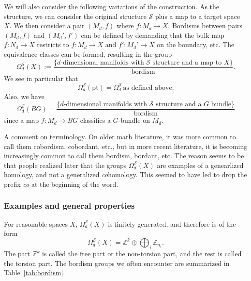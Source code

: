 \documentclass[12pt]{article}
\numberwithin{equation}{section}
\numberwithin{figure}{section}
\theoremstyle{remark}
\def\bZ{\mathbb{Z}}
\def\cS{\mathcal{S}}
\def\pt{\mathrm{pt}}
\begin{document}
We will also consider the following variations of the construction.
As the structure, we can consider the original structure $\cS$ plus a map to a target space $X$.
We then consider a pair $(M_d, f)$ where $f:M_d\to X$.
Bordisms between pairs $(M_d,f)$ and $(M_d',f')$ can be defined by demanding that 
the bulk map $f:N_d\to X$ restricts to $f:M_d\to X$ and $f':M_d'\to X$ on the boundary, etc.
The equivalence classes can be formed, resulting in the group \begin{equation}
\Omega^\cS_d(X) := \frac{
\{\text{$d$-dimensional manifolds with $\cS$ structure and a map to $X$} \} 
} { \text{bordism} }.
\end{equation}
We see in particular that \begin{equation}
\Omega^\cS_d(\pt) =\Omega^\cS_d\, \text{as defined above}.
\end{equation}
Also, we have \begin{equation}
\Omega^\cS_d(BG) =\frac{
\{\text{$d$-dimensional manifolds with $\cS$ structure and a $G$ bundle} \} 
} { \text{bordism} }
\end{equation}
since a map $f: M_d\to BG$ classifies a $G$-bundle on $M_d$.

A comment on terminology. On older math literature, it was more common to call them
cobordism, cobordant, etc., but in more recent literature, it is becoming increasingly common
to call them bordism, bordant, etc. 
The reason seems to be that people realized later that the groups $\Omega_d^\cS(X)$
are examples of a genearlized homology, and not a generalized \emph{co}homology.
This seemed to have led to drop the prefix \emph{co} at the beginning of the word.

\subsubsection{Examples and general properties}

For reasonable spaces $X$, $\Omega^\cS_d(X)$ is finitely generated,
and therefore is of the form \begin{equation}
\Omega^\cS_d(X) = \bZ^k \oplus \bigoplus_i \bZ_{n_i}.
\end{equation}
The part $\bZ^k$ is called the free part or the non-torsion part,
and the rest is called the torsion part.
The bordism groups we often encounter are summarized in Table~\ref{tab:bordism}.
\end{document}
